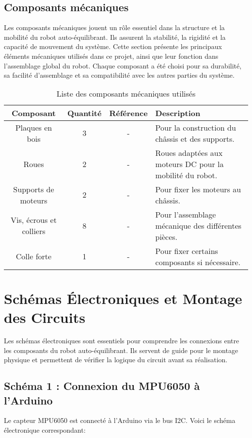 \documentclass{report}
\begin{document}
\subsection{Composants mécaniques}
Les composants mécaniques jouent un rôle essentiel dans la structure et la mobilité du robot auto-équilibrant. Ils assurent la stabilité, la rigidité et la capacité de mouvement du système. Cette section présente les principaux éléments mécaniques utilisés dans ce projet, ainsi que leur fonction dans l'assemblage global du robot. Chaque composant a été choisi pour sa durabilité, sa facilité d'assemblage et sa compatibilité avec les autres parties du système.
\begin{table}[h!]
\centering
\caption{Liste des composants mécaniques utilisés}
\label{tab:composants_mecaniques}
\begin{tabular}{|c|c|c|p{6cm}|}
\hline
\textbf{Composant} & \textbf{Quantité} & \textbf{Référence} & \textbf{Description} \\ \hline
Plaques en bois & 3 & - & Pour la construction du châssis et des supports. \\ \hline
Roues & 2 & - & Roues adaptées aux moteurs DC pour la mobilité du robot. \\ \hline
Supports de moteurs & 2 & - & Pour fixer les moteurs au châssis. \\ \hline
Vis, écrous et colliers & 8 & - & Pour l'assemblage mécanique des différentes pièces. \\ \hline
Colle forte & 1 & - & Pour fixer certains composants si nécessaire. \\ \hline

\end{tabular}
\end{table}
\vspace{6cm}
\section{Schémas Électroniques et Montage des Circuits}


Les schémas électroniques sont essentiels pour comprendre les connexions entre les composants du robot auto-équilibrant. Ils servent de guide pour le montage physique et permettent de vérifier la logique du circuit avant sa réalisation.



\subsection{Schéma 1 : Connexion du MPU6050 à l'Arduino}
Le capteur MPU6050 est connecté à l'Arduino via le bus I2C. Voici le schéma électronique correspondant:
\end{document}
